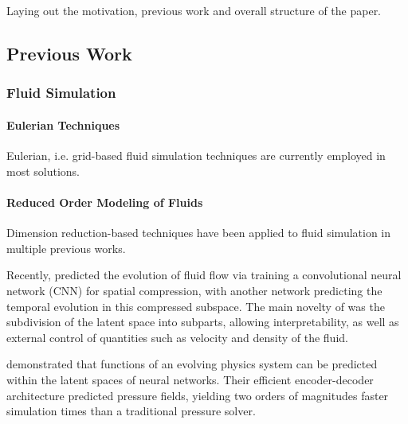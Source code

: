 \chapter{\bevezetes}

Laying out the motivation, previous work and overall structure of the paper.


\section{Previous Work}
\subsection{Fluid Simulation}

\subsubsection*{Eulerian Techniques}
Eulerian, i.e. grid-based fluid simulation techniques are currently employed in
most solutions. 


\subsubsection*{Reduced Order Modeling of Fluids}
Dimension reduction-based techniques have been applied to fluid simulation in
multiple previous works. 


Recently, \cite{LatentSpaceSubdivision} predicted the evolution of fluid flow
via training a convolutional neural network (CNN) for spatial compression, with
another network predicting the temporal evolution in this compressed subspace.
The main novelty of \cite{LatentSpaceSubdivision} was the subdivision of the
latent space into subparts, allowing interpretability, as well as external
control of quantities such as velocity and density of the fluid.

\cite{Wiewel2019LatentSP} demonstrated that functions of an evolving physics
system can be predicted within the latent spaces of neural networks. Their
efficient encoder-decoder architecture predicted pressure fields, yielding two
orders of magnitudes faster simulation times than a traditional pressure solver.

